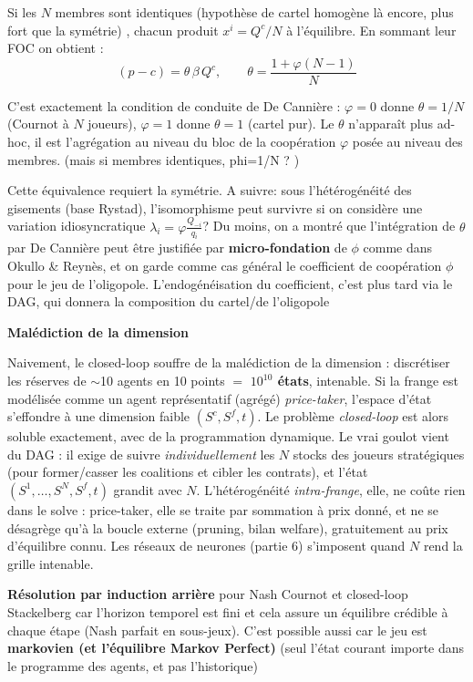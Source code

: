 \documentclass[11pt]{article}
\begin{document}
Si les $N$ membres sont identiques (hypothèse de cartel homogène là encore, plus fort que la symétrie) , chacun produit $x^i=Q^c/N$ à l'équilibre. En sommant leur FOC on obtient :
$$ (p-c) = \theta\,\beta\,Q^c, \qquad \theta = \frac{1+\varphi(N-1)}{N} $$

C'est exactement la condition de conduite de De Cannière : $\varphi=0$ donne $\theta=1/N$ (Cournot à $N$ joueurs), $\varphi=1$ donne $\theta=1$ (cartel pur). Le $\theta$ n'apparaît plus ad-hoc, il est l'agrégation au niveau du bloc de la coopération $\varphi$ posée au niveau des membres. (mais si membres identiques, phi=1/N ? )

Cette équivalence  requiert la symétrie. A suivre: sous l'hétérogénéité des gisements (base Rystad), l'isomorphisme peut survivre si on considère une variation idiosyncratique $\lambda_i = \varphi \frac{Q_{-i}}{q_i}$? Du moins, on a montré que l'intégration de $\theta$ par De Cannière peut être justifiée par \textbf{micro-fondation} de $\phi$ comme dans Okullo \& Reynès, et on garde comme cas général le coefficient de coopération $\phi$ pour le jeu de l'oligopole. L'endogénéisation du coefficient, c'est plus tard via le DAG, qui donnera la composition du cartel/de l'oligopole


\textbf{Malédiction de la dimension}  

Naivement, le closed-loop souffre de la malédiction de la dimension : discrétiser
les réserves de $\sim$10 agents en 10 points $=$ \textbf{$10^{10}$ états}, intenable.
Si la frange est modélisée comme un agent représentatif (agrégé) \emph{price-taker}, l'espace d'état s'effondre à une dimension faible $(S^c, S^f, t)$. Le problème \emph{closed-loop} est alors soluble exactement, avec de la programmation dynamique.
Le vrai goulot vient du DAG : il exige de suivre \emph{individuellement} les $N$ stocks des joueurs stratégiques (pour former/casser les coalitions et cibler les contrats), et l'état $(S^1,\dots,S^N, S^f, t)$ grandit avec $N$. L'hétérogénéité \emph{intra-frange}, elle, ne co\^ute rien dans le solve : price-taker, elle se traite par sommation à prix donné, et ne se désagrège qu'à la boucle externe (pruning, bilan welfare), gratuitement au prix d'équilibre connu. Les réseaux de neurones (partie 6) s'imposent quand $N$ rend la grille intenable.

\textbf{Résolution par induction arrière} pour Nash Cournot et closed-loop Stackelberg car l'horizon temporel est fini et cela assure un équilibre crédible à chaque étape (Nash parfait en sous-jeux). C'est possible aussi car le jeu est \textbf{markovien (et l'équilibre Markov Perfect)} (seul l'état courant importe dans le programme des agents, et pas l'historique)
\end{document}
